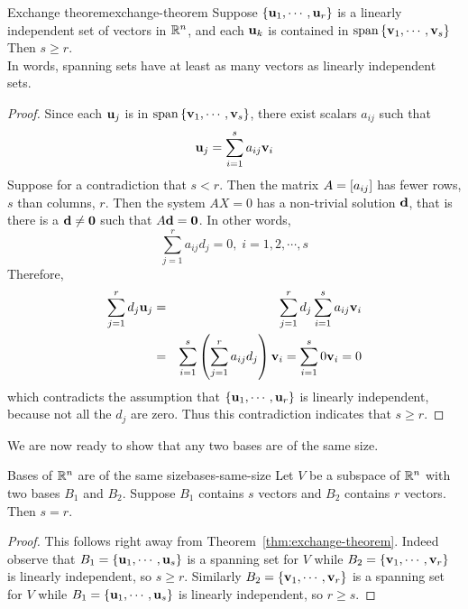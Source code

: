 \begin{theorem}{Exchange theorem}{exchange-theorem}
  Suppose $\left\{\mbox{\bf u}_{1},\cdots ,\mbox{\bf u}_{r}\right\} $ is a linearly
  independent set of vectors in $\mathbb{R}^n$, and each $\mbox{\bf u}_{k}$ is
  contained in $\sspan\set{\vect{v}_{1},\cdots
    ,\vect{v}_{s}}$ Then $s\geq r$. \\
  In words, spanning sets have at least as
  many vectors as linearly independent sets.
\end{theorem}

\begin{proof}
  Since each $\mbox{\bf u}_j$ is in
  $\sspan\set{\vect{v}_{1},\cdots ,\vect{v}_{s}} $, there exist
  scalars $a_{ij}$ such that
  \begin{equation*}
    \mbox{\bf u}_{j}=\sum_{i=1}^{s}a_{ij}\mbox{\bf v}_{i}
  \end{equation*}
  Suppose for a contradiction that $s<r$. Then the matrix
  $A = \left[ a_{ij} \right]$ has fewer rows, $s$ than columns, $r$. Then the
  system $AX=0$ has %
  a non-trivial solution $\mbox{\bf d}$, that is there is a
  $\mbox{\bf d}\neq \mbox{\bf 0}$ such that $A\mbox{\bf d}=\mbox{\bf 0}$. In other
  words,
  \begin{equation*}
    \sum_{j=1}^{r}a_{ij}d_{j}=0,\;i=1,2,\cdots ,s
  \end{equation*}
  Therefore, 
  \begin{eqnarray*}
    \sum_{j=1}^{r}d_{j}\mbox{\bf u}_{j}
    &=&\sum_{j=1}^{r}d_{j}\sum_{i=1}^{s}a_{ij}
        \mbox{\bf v}_{i} \\
    &=&\sum_{i=1}^{s}\left(\sum_{j=1}^{r}a_{ij}d_{j}\right) \mbox{\bf v}
        _{i}=\sum_{i=1}^{s}0\mbox{\bf v}_{i}=0
  \end{eqnarray*}
  which contradicts the assumption that
  $\left\{\mbox{\bf u}_{1},\cdots ,\mbox{\bf u}_{r}\right\} $ is linearly independent,
  because not all the $d_{j}$ are zero. Thus this contradiction
  indicates that $s\geq r$.
\end{proof}

We are now ready to show that any two bases are of the same size.

\begin{theorem}{Bases of $\mathbb{R}^{n}$ are of the same size}{bases-same-size}
  Let $V$ be a subspace of $\mathbb{R}^{n}$ with two bases $B_1$ and
  $B_2$. Suppose $B_1$ contains $s$ vectors and $B_2$ contains $r$
  vectors. Then $s=r$.
\end{theorem}

\begin{proof}
  This follows right away from
  Theorem~\ref{thm:exchange-theorem}. Indeed observe that
  $B_1 = \left\{ \mbox{\bf u}_{1},\cdots ,\mbox{\bf u}_{s}\right\} $ is a spanning set
  for $V$ while $ B_2 = \left\{\mbox{\bf v}_{1},\cdots ,\mbox{\bf v}_{r}\right\} $ is
  linearly independent, so $s \geq r$. Similarly
  $B_2 = \left\{\mbox{\bf v}_{1},\cdots ,\mbox{\bf v} _{r}\right\} $ is a spanning set
  for $V$ while $B_1 = \left\{\mbox{\bf u}_{1},\cdots , \mbox{\bf u}_{s}\right\} $ is
  linearly independent, so $r\geq s$.
\end{proof}

